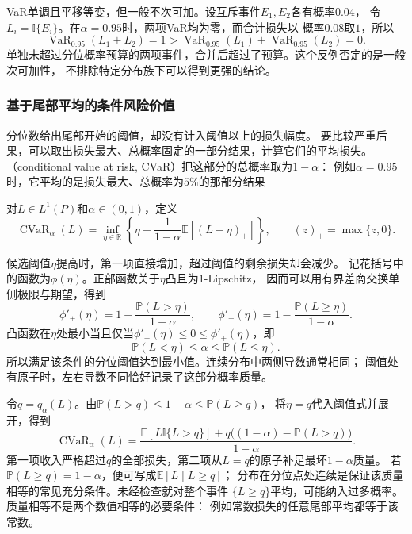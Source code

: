 VaR单调且平移等变，但一般不次可加。设互斥事件$E_1,E_2$各有概率$0.04$，
令$L_i=\mathbb I\{E_i\}$。在$\alpha=0.95$时，两项VaR均为零，而合计损失以
概率$0.08$取$1$，所以
\[
  \operatorname{VaR}_{0.95}(L_1+L_2)=1
  >\operatorname{VaR}_{0.95}(L_1)+\operatorname{VaR}_{0.95}(L_2)=0.
\]
单独未超过分位概率预算的两项事件，合并后超过了预算。这个反例否定的是一般次可加性，
不排除特定分布族下可以得到更强的结论。

\subsubsection{基于尾部平均的条件风险价值}

分位数给出尾部开始的阈值，却没有计入阈值以上的损失幅度。
要比较严重后果，可以取出损失最大、总概率固定的一部分结果，计算它们的平均损失。
（conditional value at risk, CVaR）把这部分的总概率取为$1-\alpha$：
例如$\alpha=0.95$时，它平均的是损失最大、总概率为$5\%$的那部分结果
\begin{definition}[条件风险价值]
\label{def:decision-conditional-value-at-risk}
对$L\in L^1(P)$和$\alpha\in(0,1)$，定义
\begin{equation}
  \operatorname{CVaR}_\alpha(L)
  =\inf_{\eta\in\mathbb R}
    \left\{\eta+\frac{1}{1-\alpha}\mathbb E[(L-\eta)_+]\right\},
  \qquad (z)_+=\max\{z,0\}.
  \label{eq:decision-cvar-optimization}
\end{equation}
\end{definition}
候选阈值$\eta$提高时，第一项直接增加，超过阈值的剩余损失却会减少。
记花括号中的函数为$\phi(\eta)$。正部函数关于$\eta$凸且为$1$-Lipschitz，
因而可以用有界差商交换单侧极限与期望，得到
\[
  \phi'_+(\eta)=1-\frac{\mathbb P(L>\eta)}{1-\alpha},\qquad
  \phi'_-(\eta)=1-\frac{\mathbb P(L\geq\eta)}{1-\alpha}.
\]
凸函数在$\eta$处最小当且仅当$\phi'_-(\eta)\leq0\leq\phi'_+(\eta)$，即
\begin{equation}
  \mathbb P(L<\eta)\leq\alpha\leq\mathbb P(L\leq\eta).
  \label{eq:decision-cvar-quantile-condition}
\end{equation}
所以满足该条件的分位阈值达到最小值。连续分布中两侧导数通常相同；
阈值处有原子时，左右导数不同恰好记录了这部分概率质量。

令$q=q_\alpha(L)$。由$\mathbb P(L>q)\leq1-\alpha\leq\mathbb P(L\geq q)$，
将$\eta=q$代入阈值式并展开，得到
\begin{equation}
  \operatorname{CVaR}_\alpha(L)=
  \frac{\mathbb E[L\mathbb I\{L>q\}]
    +q\bigl((1-\alpha)-\mathbb P(L>q)\bigr)}{1-\alpha}.
  \label{eq:decision-cvar-atomic-tail}
\end{equation}
第一项收入严格超过$q$的全部损失，第二项从$L=q$的原子补足最坏$1-\alpha$质量。
若$\mathbb P(L\geq q)=1-\alpha$，便可写成$\mathbb E[L\mid L\geq q]$；
分布在分位点处连续是保证该质量相等的常见充分条件。未经检查就对整个事件
$\{L\geq q\}$平均，可能纳入过多概率。质量相等不是两个数值相等的必要条件：
例如常数损失的任意尾部平均都等于该常数。

